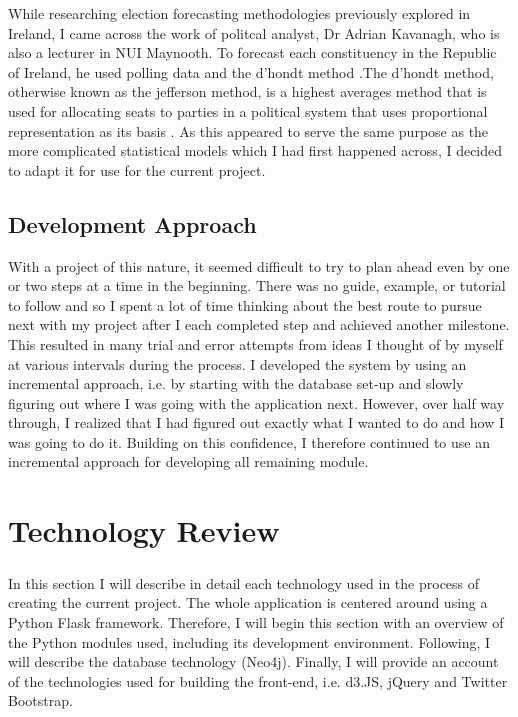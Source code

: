 While researching election forecasting methodologies previously explored in Ireland, I came across the work of politcal analyst, Dr Adrian Kavanagh, who is also a lecturer in NUI Maynooth. To forecast each constituency in the Republic of Ireland, he used polling data and the d’hondt method \cite{adrian}.The d’hondt method, otherwise known as the jefferson method, is a highest averages method that is used for allocating seats to parties in a political system that uses proportional representation as its basis \cite{dhondt}.  As this appeared to serve the same purpose as the more complicated statistical models which I had first happened across,  I decided to adapt it for use for the current project.
\section{Development Approach}
With a project of this nature, it seemed difficult to try to plan ahead even by one or two steps at a time in the beginning.  There was no guide, example, or tutorial to follow and so I spent a lot of time thinking about the best route to pursue next with my project after I each completed step and achieved another milestone. This resulted in many trial and error attempts from ideas I thought of by myself at various intervals during the process. I developed the system by using an incremental approach, i.e. by starting with the database set-up and slowly figuring out where I was going with the application next. However, over half way through, I realized that I had figured out exactly what I wanted to do and how I was going to do it. Building on this confidence, I therefore continued to use an incremental approach for developing all remaining module.

\chapter{Technology Review}
\paragraph{}
In this section I will describe in detail each technology used in the process of creating the current project. The whole application is centered around using a Python Flask framework. Therefore, I will begin this section with an overview of the Python modules used, including its development environment. Following, I will describe the database technology (Neo4j). Finally, I will provide an account of the technologies used for building the front-end, i.e. d3.JS, jQuery and Twitter Bootstrap.

